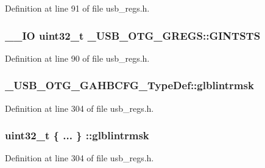 Definition at line 91 of file usb\-\_\-regs.\-h.

\hypertarget{group___u_s_b___o_t_g___d_r_i_v_e_r_ga55882277285fb2848a0598d078890834}{
\subsubsection[{G\-I\-N\-T\-S\-T\-S}]{\setlength{\rightskip}{0pt plus 5cm}\-\_\-\-\_\-\-I\-O {\bf uint32\-\_\-t} \-\_\-\-U\-S\-B\-\_\-\-O\-T\-G\-\_\-\-G\-R\-E\-G\-S\-::\-G\-I\-N\-T\-S\-T\-S}}\label{group___u_s_b___o_t_g___d_r_i_v_e_r_ga55882277285fb2848a0598d078890834}


Definition at line 90 of file usb\-\_\-regs.\-h.

\hypertarget{group___u_s_b___o_t_g___d_r_i_v_e_r_ga6d5b18dc5c45a9377ff26ae705e237f0}{
\subsubsection[{glblintrmsk}]{ \-\_\-\-U\-S\-B\-\_\-\-O\-T\-G\-\_\-\-G\-A\-H\-B\-C\-F\-G\-\_\-\-Type\-Def\-::glblintrmsk}}\label{group___u_s_b___o_t_g___d_r_i_v_e_r_ga6d5b18dc5c45a9377ff26ae705e237f0}


Definition at line 304 of file usb\-\_\-regs.\-h.

\hypertarget{group___u_s_b___o_t_g___d_r_i_v_e_r_gab36c5e2f90bc083748d738355accba33}{
\subsubsection[{glblintrmsk}]{\setlength{\rightskip}{0pt plus 5cm}uint32\-\_\-t \{ ... \} \-::glblintrmsk}}\label{group___u_s_b___o_t_g___d_r_i_v_e_r_gab36c5e2f90bc083748d738355accba33}


Definition at line 304 of file usb\-\_\-regs.\-h.

